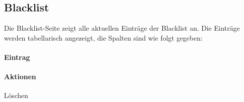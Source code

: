 \subsection{Blacklist}

Die Blacklist-Seite zeigt alle aktuellen Einträge der Blacklist an.
Die Einträge werden tabellarisch angezeigt, die Spalten sind wie folgt gegeben:

\paragraph*{Eintrag}
\paragraph*{Aktionen}
    Löschen